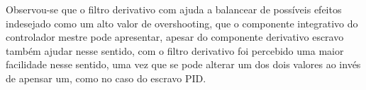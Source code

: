 Observou-se que o filtro derivativo com ajuda a balancear de possíveis efeitos indesejado como um alto valor de overshooting,
que o componente integrativo do controlador mestre pode apresentar, apesar do componente derivativo escravo também ajudar nesse
sentido, com o filtro derivativo foi percebido uma maior facilidade nesse sentido, uma vez que se pode alterar um dos dois valores
ao invés de apensar um, como no caso do escravo PID.